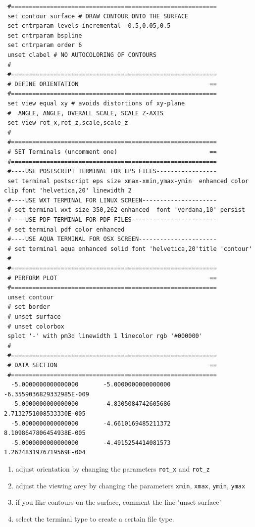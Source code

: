 \documentclass[final,12pt]{article}
\begin{document}
{{{{{{{\begin{verbatim}
 #==========================================================
 set contour surface # DRAW CONTOUR ONTO THE SURFACE
 set cntrparam levels incremental -0.5,0.05,0.5
 set cntrparam bspline
 set cntrparam order 6
 unset clabel # NO AUTOCOLORING OF CONTOURS
 #
 #==========================================================
 # DEFINE ORIENTATION                                     ==
 #==========================================================
 set view equal xy # avoids distortions of xy-plane
 #  ANGLE, ANGLE, OVERALL SCALE, SCALE Z-AXIS
 set view rot_x,rot_z,scale,scale_z
 #
 #==========================================================
 # SET Terminals (uncomment one)                          ==
 #==========================================================
 #----USE POSTSCRIPT TERMINAL FOR EPS FILES-----------------
 set terminal postscript eps size xmax-xmin,ymax-ymin  enhanced color clip font 'helvetica,20' linewidth 2 
 #----USE WXT TERMINAL FOR LINUX SCREEN---------------------
 # set terminal wxt size 350,262 enhanced  font 'verdana,10' persist 
 #----USE PDF TERMINAL FOR PDF FILES------------------------
 # set terminal pdf color enhanced 
 #----USE AQUA TERMINAL FOR OSX SCREEN----------------------
 # set terminal aqua enhanced solid font 'helvetica,20'title 'contour'
 #
 #==========================================================
 # PERFORM PLOT                                           ==
 #==========================================================
 unset contour
 # set border
 # unset surface
 # unset colorbox
 splot '-' with pm3d linewidth 1 linecolor rgb '#000000'
 #
 #==========================================================
 # DATA SECTION                                           ==
 #==========================================================
  -5.0000000000000000       -5.0000000000000000       -6.3559036829332985E-009
  -5.0000000000000000       -4.8305084742605686        2.7132751008533330E-005
  -5.0000000000000000       -4.6610169485211372        8.1098647806454938E-005
  -5.0000000000000000       -4.4915254414081573        1.2624831976719569E-004
\end{verbatim}}

\begin{enumerate}
\item adjust orientation by changing the parameters \verb|rot_x| and
  \verb|rot_z|
\item adjust the viewing arey by changing the parameters \verb|xmin|,
  \verb|xmax|, \verb|ymin|, \verb|ymax|
\item if you like contours on the surface, comment the line 'unset surface'
\item select the terminal type to create a certain file type.
\end{enumerate}



}}}}}}
\end{document}
